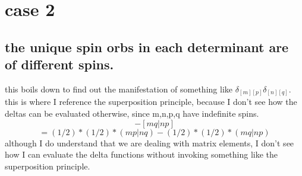\documentclass[12pt]{article}
\begin{document}
\section{case 2}
\subsection{the unique spin orbs in each determinant are of different spins.}

this boils down to find out the manifestation of something like $\delta _{[m][p]}\delta _{[n][q]}$. this is where I reference the superposition principle, because I don't see how the deltas can be evaluated otherwise, since m,n,p,q have indefinite spins.
\begin{equation}
    [mp|nq]-[mq|np]
\end{equation}
\begin{equation}
    =(1/2)*(1/2)*(mp|nq)-(1/2)*(1/2)*(mq|np)
\end{equation}
although I do understand that we are dealing with matrix elements, I don't see how I can evaluate the delta functions without invoking something like the superposition principle.
\end{document}
